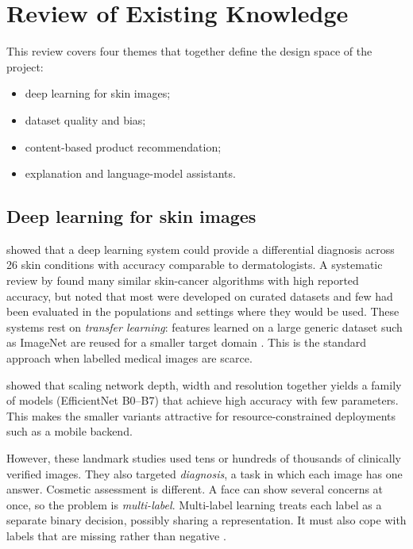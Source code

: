 \section{Review of Existing Knowledge}
\label{sec:lit}

This review covers four themes that together define the design space of the project:
\begin{itemize}
  \item deep learning for skin images;
  \item dataset quality and bias;
  \item content-based product recommendation;
  \item explanation and language-model assistants.
\end{itemize}

\subsection*{Deep learning for skin images}

\citet{liu2020} showed that a deep learning system could provide a differential diagnosis across 26 skin conditions with accuracy comparable to dermatologists. A systematic review by \citet{jones2022} found many similar skin-cancer algorithms with high reported accuracy, but noted that most were developed on curated datasets and few had been evaluated in the populations and settings where they would be used. These systems rest on \emph{transfer learning}: features learned on a large generic dataset such as ImageNet are reused for a smaller target domain \citep{zhuang2021}. This is the standard approach when labelled medical images are scarce.

\citet{tan2019} showed that scaling network depth, width and resolution together yields a family of models (EfficientNet B0--B7) that achieve high accuracy with few parameters. This makes the smaller variants attractive for resource-constrained deployments such as a mobile backend.

However, these landmark studies used tens or hundreds of thousands of clinically verified images. They also targeted \emph{diagnosis}, a task in which each image has one answer. Cosmetic assessment is different. A face can show several concerns at once, so the problem is \emph{multi-label}. Multi-label learning treats each label as a separate binary decision, possibly sharing a representation. It must also cope with labels that are missing rather than negative \citep{liu2022multilabel}.

